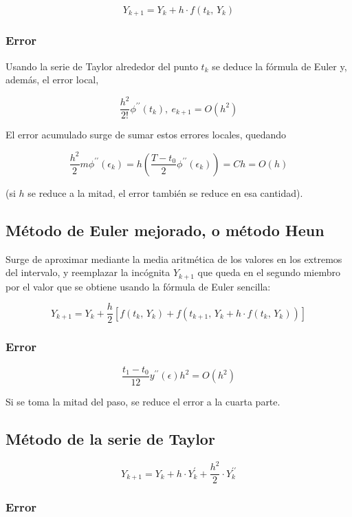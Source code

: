 \documentclass{article}
\begin{document}
\[ Y_{k+1} = Y_{k} + h \cdot f(t_k,\, Y_k) \]

\subsubsection{Error}

Usando la serie de Taylor alrededor del punto $t_k$ se deduce la fórmula de 
Euler y, además, el error local,

\[ \frac{h^2}{2!} \phi^{\prime\prime}(t_k),\ e_{k+1} = O(h^2) \]

El error acumulado surge de sumar estos errores locales, quedando 

\[ 
    \frac{h^2}{2} m \phi^{\prime\prime} (\epsilon_k) = 
    h \left( \frac{T-t_0}{2} \phi^{\prime\prime}(\epsilon_k) \right) 
    = Ch = O(h) \]

(si $h$ se reduce a la mitad, el error también se reduce en esa cantidad).

\subsection{Método de Euler mejorado, o método Heun}

Surge de aproximar mediante la media aritmética de los valores en los extremos
del intervalo, y reemplazar la incógnita $Y_{k+1}$ que queda en el segundo 
miembro por el valor que se obtiene usando la fórmula de Euler sencilla:

\[
    Y_{k+1} = Y_k + \frac{h}{2}\left[ f(t_k,\,Y_k) + f(t_{k+1},\, 
    Y_k + h \cdot f(t_k,\, Y_k)) \right]
\]

\subsubsection{Error}

\[
    \frac{t_1 - t_0}{12} y^{\prime\prime} (\epsilon) h^2 = O(h^2)
\]

Si se toma la mitad del paso, se reduce el error a la cuarta parte.

\subsection{Método de la serie de Taylor}

\[
    Y_{k+1} = Y_k + h \cdot Y^\prime_k + \frac{h^2}{2}\cdot Y^{\prime\prime}_k
\]

\subsubsection{Error}
\end{document}
